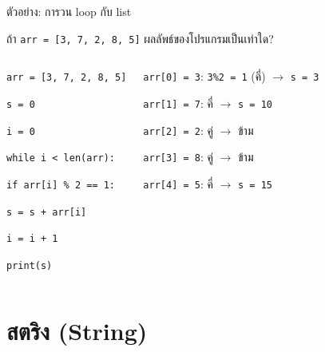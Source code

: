 \documentclass[11pt, aspectratio=169]{beamer}
\newcommand{\py}[1]{\texttt{#1}}
\begin{document}
\begin{frame}{ตัวอย่าง: การวน loop กับ list}
  \begin{exambox}[โจทย์]
    ถ้า \py{arr = [3, 7, 2, 8, 5]} ผลลัพธ์ของโปรแกรมเป็นเท่าใด?
  \end{exambox}
  \begin{columns}[T]
      \begin{exambox}[โปรแกรม]
        \py{arr = [3, 7, 2, 8, 5]}

        \py{s = 0}

        \py{i = 0}

        \py{while i < len(arr):}

        \qquad \py{if arr[i] \% 2 == 1:}

        \qquad\quad \py{s = s + arr[i]}

        \qquad \py{i = i + 1}

        \py{print(s)}
      \end{exambox}
      \begin{solbox}[วิธีตามรอย]
        \py{arr[0] = 3}: \py{3\%2 = 1} (คี่) $\rightarrow$ \py{s = 3}

        \py{arr[1] = 7}: คี่ $\rightarrow$ \py{s = 10}

        \py{arr[2] = 2}: คู่ $\rightarrow$ ข้าม

        \py{arr[3] = 8}: คู่ $\rightarrow$ ข้าม

        \py{arr[4] = 5}: คี่ $\rightarrow$ \py{s = 15}

        \highlight{แสดงผล \py{15}}
      \end{solbox}
  \end{columns}
\end{frame}

\section{สตริง (String)}
\end{document}
